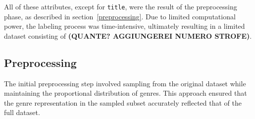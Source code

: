 All of these attributes, except for \texttt{title}, were the result
of the preprocessing phase, as described in section~\ref{preprocessing}.
Due to limited computational power, the labeling process was time-intensive,
ultimately resulting in a limited dataset consisting of
\textbf{(QUANTE? AGGIUNGEREI NUMERO STROFE)}.

\subsection*{Preprocessing}
\label{preprocessing}
The initial preprocessing step involved sampling from the original dataset
while maintaining the proportional distribution of genres.
This approach ensured that the genre representation in the sampled subset
accurately reflected that of the full dataset.\\


